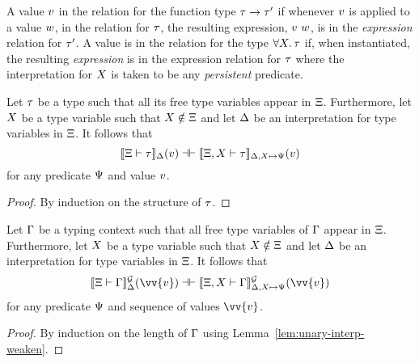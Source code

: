 A value $v$ in the relation for the function type $\tau \to \tau'$
if whenever $v$ is applied to a value $w$, in the relation for
$\tau$, the resulting expression, $v~w$, is in the
\emph{expression} relation for $\tau'$. A value is in the relation for
the type $\Tall \tvar. \typ$ if, when instantiated, the resulting
\emph{expression} is in the expression relation for $\tau$ where the
interpretation for $X$ is taken to be any \emph{persistent}
predicate.

\begin{lemma} \label{lem:unary-interp-weaken} Let $\tau$ be a type
  such that all its free type variables appear in $\Xi$.
  Furthermore, let $X$ be a type variable such that
  $X \notin \Xi$ and let $\Delta$ be an interpretation for
  type variables in $\Xi$. It follows that
  \[\llbracket \Xi \vdash \tau \rrbracket_{\Delta}(v) \mathrel{\dashv\vdash} \llbracket \Xi,
      X \vdash \tau \rrbracket_{\Delta, X \mapsto \Psi}(v)
  \] for any predicate $\Psi$ and value $v$.
\end{lemma}
\begin{proof}
  By induction on the structure of $\tau$.
\end{proof}

\begin{lemma} \label{lem:unary-interp-env-weaken} Let $\Gamma$ be a typing context
  such that all free type variables of $\Gamma$ appear in
  $\Xi$. Furthermore, let $X$ be a type variable such that
  $X \notin \Xi$ and let $\Delta$ be an interpretation for
  type variables in $\Xi$. It follows that
  \[\semGtype{\Tenv}{\env}{\semenv}(\vv{\val}) \provesIff \semGtype{\Tenv,
      \tvar}{\env}{\semenv, \tvar \mapsto \predB}(\vv{\val})
  \] for any predicate $\Psi$ and sequence of values $\vv{\val}$.
\end{lemma}
\begin{proof}
  By induction on the length of $\Gamma$ using Lemma~\ref{lem:unary-interp-weaken}.
\end{proof}

